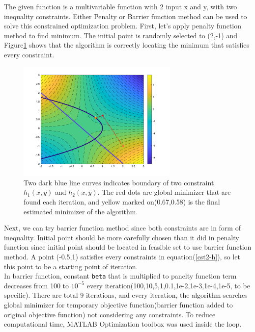\documentclass[twoside,11pt]{article}
\begin{document}
The given function is a multivariable function with 2 input x and y, with two inequality constraints. Either Penalty or Barrier function method can be used to solve this constrained optimization problem. 
First, let's apply penalty function method to find minimum. The initial point is randomly selected to (2,-1) and Figure\ref{constrained problem 2} shows that the algorithm is correctly locating the minimum that satisfies every constraint.

\begin{figure}[!h]
    \centering
    \includegraphics[width=0.7\textwidth]{figs/cst_2.png}
    \caption{Two dark blue line curves indicates boundary of two constraint $h_1(x,y)$ and $h_2(x,y)$. The red dots are global minimizer that are found each iteration, and yellow marked on(0.67,0.58) is the final estimated minimizer of the algorithm.}
\label{constrained problem 2}
\end{figure}

Next, we can try barrier function method since both constraints are in form of inequality. Initial point should be more carefully chosen than it did in penalty function since initial point should be located in feasible set to use barrier function method. A point (-0.5,1) satisfies every constraints in equation(\ref{cst2-h}), so let this point to be a starting point of iteration.\\
In barrier function, constant \texttt{beta} that is multiplied to panelty function term decreases from 100 to $10^{-5}$ every iteration(100,10,5,1,0.1,1e-2,1e-3,1e-4,1e-5, to be specific). There are total 9 iterations, and every iteration, the algorithm searches global minimizer for temporary objective function(barrier function added to original objective function) not considering any constraints. To reduce computational time, MATLAB Optimization toolbox was used inside the loop.
\end{document}
